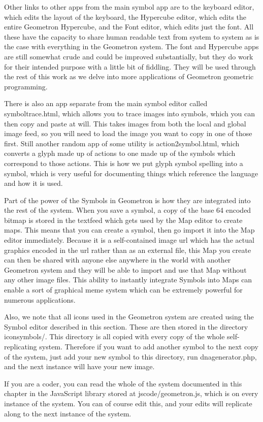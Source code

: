 Other links to other apps from the main symbol app are to the keyboard editor, which edits the layout of the keyboard, the Hypercube editor, which edits the entire Geometron Hypercube, and the Font editor, which edits just the font.  All these have the capacity to share human readable text from system to system as is the case with everything in the Geometron system.  The font and Hypercube apps are still somewhat crude and could be improved substantially, but they do work for their intended purpose with a little bit of fiddling.  They will be used through the rest of this work as we delve into more applications of Geometron geometric programming. 

There is also an app separate from the main symbol editor called symboltrace.html, which allows you to trace images into symbols, which you can then copy and paste at will.  This takes images from both the local and global image feed, so you will need to load the image you want to copy in one of those first.  Still another random app of some utility is action2symbol.html, which converts a glyph made up of actions to one made up of the symbols which correspond to those actions.  This is how we put glyph symbol spelling into a symbol, which is very useful for documenting things which reference the language and how it is used.  

Part of the power of the Symbols in Geometron is how they are integrated into the rest of the system.  When you save a symbol, a copy of the base 64 encoded bitmap is stored in the textfeed which gets used by the Map editor to create maps.  This means that you can create a symbol, then go import it into the Map editor immediately.  Because it is a self-contained image url which has the actual graphics encoded in the url rather than as an external file, this Map you create can then be shared with anyone else anywhere in the world with another Geometron system and they will be able to import and use that Map without any other image files.  This ability to instantly integrate Symbols into Maps can enable a sort of graphical meme system which can be extremely powerful for numerous applications.


Also, we note that all icons used in the Geometron system are created using the Symbol editor described in this section.  These are then stored in the directory iconsymbols/.  This directory is all copied with every copy of the whole self-replicating system.  Therefore if you want to add another symbol to the next copy of the system, just add your new symbol to this directory, run dnagenerator.php, and the next instance will have your new image.

If you are a coder, you can read the whole of the system documented in this chapter in the JavaScript library stored at jscode/geometron.js, which is on every instance of the system.  You can of course edit this, and your edits will replicate along to the next instance of the system.
